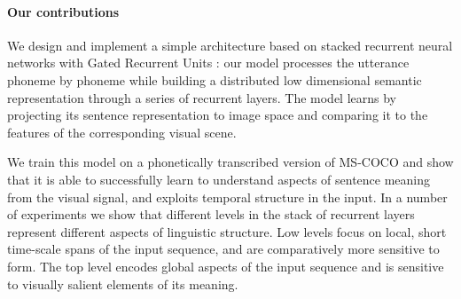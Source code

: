 \paragraph{Our contributions}

We design and implement a simple architecture based on stacked
recurrent neural networks with Gated Recurrent Units
\cite{chung2014empirical}: our model processes the utterance phoneme
by phoneme while building a distributed low dimensional semantic
representation through a series of recurrent layers.  The model learns
by projecting its sentence representation to image
space and comparing it to the features of the corresponding visual
scene.

We train this model on a phonetically transcribed
version of MS-COCO \cite{lin2014microsoft} and show that it is able to
successfully learn to understand aspects of sentence meaning from the
visual signal, and exploits temporal structure in the input. In a
number of experiments we show that different levels in the stack of
recurrent layers represent different aspects of linguistic
structure. Low levels focus on local, short time-scale spans of the
input sequence, and are comparatively more sensitive to form. The top
level encodes global aspects of the input sequence and is sensitive to
visually salient elements of its meaning.

